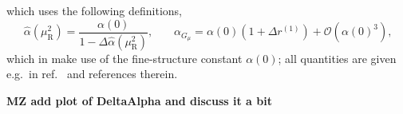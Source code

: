 which uses the following definitions,
\begin{equation}
\hat{\alpha} (\mu_\mathrm{R}^2) = \frac{\alpha(0)}{1 - \Delta \hat{\alpha} (\mu_\mathrm{R}^2)} \text{,} \qquad \alpha_{G_\mu} = \alpha(0) \left( 1 + \Delta r^{(1)} \right) + \mathcal{O} (\alpha(0)^3) \text{,}
\end{equation}
which in make use of the fine-structure constant $\alpha(0)$; all quantities are given e.g.\ in ref.~\cite{Denner:2019vbn} and references therein.

{\bf MZ add plot of DeltaAlpha and discuss it a bit}
